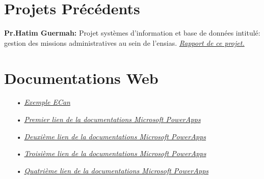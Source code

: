 \documentclass[a4paper]{report}
\begin{document}
\begin{doublespace}
	\section{Projets Précédents}

	\textbf{Pr.Hatim Guermah:} Projet systèmes d’information et base de données intitulé: gestion des missions
	administratives au sein de l’ensias. \href{https://drive.google.com/file/d/13BZiRGEFTJO-wN1fIeIMevWrprIbC12t/view?usp=sharing}{\textit{Rapport de ce projet.}}
	\section{Documentations Web}

	\begin{itemize}
		\item[•] \href{https://powerapps.microsoft.com/fr-fr/blog/environment-canterbury-speeds-up-outcome-tracking-with-the-power-platform/}{\textit{Exemple ECan}}
		\item[•] \href{https://emea01.safelinks.protection.outlook.com/?url=https%3A%2F%2Fdocs.microsoft.com%2Fen-us%2Fpowerapps%2Fmaker%2Fcanvas-apps%2F&data=04%7C01%7C%7Ce65e3af41e9e410f992a08d95cc734ff%7C84df9e7fe9f640afb435aaaaaaaaaaaa%7C1%7C0%7C637642832931864679%7CUnknown%7CTWFpbGZsb3d8eyJWIjoiMC4wLjAwMDAiLCJQIjoiV2luMzIiLCJBTiI6Ik1haWwiLCJXVCI6Mn0%3D%7C1000&sdata=ml2KrrKcMUPLsWsH8d7ZDjdeXtLx9S985dY5hgI1RJI%3D&reserved=0}{\textit{Premier lien de la documentations Microsoft PowerApps}}
		\item[•] \href{https://emea01.safelinks.protection.outlook.com/?url=https%3A%2F%2Fdocs.microsoft.com%2Fen-us%2Fpowerapps%2Fmaker%2Fcanvas-apps%2Fget-started-create-from-data&data=04%7C01%7C%7Ce65e3af41e9e410f992a08d95cc734ff%7C84df9e7fe9f640afb435aaaaaaaaaaaa%7C1%7C0%7C637642832931869656%7CUnknown%7CTWFpbGZsb3d8eyJWIjoiMC4wLjAwMDAiLCJQIjoiV2luMzIiLCJBTiI6Ik1haWwiLCJXVCI6Mn0%3D%7C1000&sdata=TYbRoGvzIzwO4PThp3yUtywRr76KLIIUmJqSSvyN8MY%3D&reserved=0}{\textit{Deuxième lien de la documentations Microsoft PowerApps}}
		\item[•] \href{https://emea01.safelinks.protection.outlook.com/?url=https%3A%2F%2Fdocs.microsoft.com%2Fen-us%2Fpowerapps%2Fmaker%2Fcanvas-apps%2Fadd-form&data=04%7C01%7C%7Ce65e3af41e9e410f992a08d95cc734ff%7C84df9e7fe9f640afb435aaaaaaaaaaaa%7C1%7C0%7C637642832931874635%7CUnknown%7CTWFpbGZsb3d8eyJWIjoiMC4wLjAwMDAiLCJQIjoiV2luMzIiLCJBTiI6Ik1haWwiLCJXVCI6Mn0%3D%7C1000&sdata=S8RfTDyJ%2F3ZvtP4lwqBSSMAWrbXd85oLdXiEkFO6LLQ%3D&reserved=0}{\textit{Troisième lien de la documentations Microsoft PowerApps}}
		\item[•] \href{https://emea01.safelinks.protection.outlook.com/?url=https%3A%2F%2Fdocs.microsoft.com%2Fen-us%2Fpowerapps%2Fmaker%2Fcanvas-apps%2Fdependent-drop-down-lists&data=04%7C01%7C%7Ce65e3af41e9e410f992a08d95cc734ff%7C84df9e7fe9f640afb435aaaaaaaaaaaa%7C1%7C0%7C637642832931879615%7CUnknown%7CTWFpbGZsb3d8eyJWIjoiMC4wLjAwMDAiLCJQIjoiV2luMzIiLCJBTiI6Ik1haWwiLCJXVCI6Mn0%3D%7C1000&sdata=x8uoZpDPhhwkV%2FJhJFVIo4NZwVNOUULsb9etpMMT%2Bio%3D&reserved=0}{\textit{Quatrième lien de la documentations Microsoft PowerApps}}
	\end{itemize}

\end{doublespace}
\end{document}
